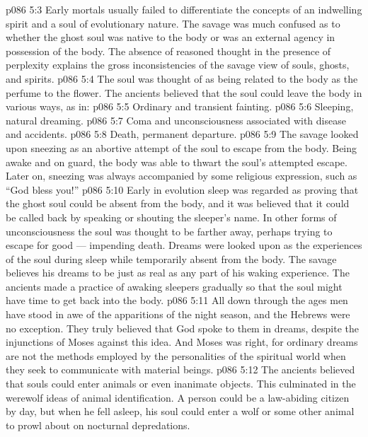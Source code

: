 \vs p086 5:3 Early mortals usually failed to differentiate the concepts of an indwelling spirit and a soul of evolutionary nature. The savage was much confused as to whether the ghost soul was native to the body or was an external agency in possession of the body. The absence of reasoned thought in the presence of perplexity explains the gross inconsistencies of the savage view of souls, ghosts, and spirits.
\vs p086 5:4 The soul was thought of as being related to the body as the perfume to the flower. The ancients believed that the soul could leave the body in various ways, as in:
\vs p086 5:5 \bibnobreakspace Ordinary and transient fainting.
\vs p086 5:6 \bibnobreakspace Sleeping, natural dreaming.
\vs p086 5:7 \bibnobreakspace Coma and unconsciousness associated with disease and accidents.
\vs p086 5:8 \bibnobreakspace Death, permanent departure.
\vs p086 5:9 \pc The savage looked upon sneezing as an abortive attempt of the soul to escape from the body. Being awake and on guard, the body was able to thwart the soul’s attempted escape. Later on, sneezing was always accompanied by some religious expression, such as “God bless you!”
\vs p086 5:10 \pc Early in evolution sleep was regarded as proving that the ghost soul could be absent from the body, and it was believed that it could be called back by speaking or shouting the sleeper’s name. In other forms of unconsciousness the soul was thought to be farther away, perhaps trying to escape for good --- impending death. Dreams were looked upon as the experiences of the soul during sleep while temporarily absent from the body. The savage believes his dreams to be just as real as any part of his waking experience. The ancients made a practice of awaking sleepers gradually so that the soul might have time to get back into the body.
\vs p086 5:11 All down through the ages men have stood in awe of the apparitions of the night season, and the Hebrews were no exception. They truly believed that God spoke to them in dreams, despite the injunctions of Moses against this idea. And Moses was right, for ordinary dreams are not the methods employed by the personalities of the spiritual world when they seek to communicate with material beings.
\vs p086 5:12 The ancients believed that souls could enter animals or even inanimate objects. This culminated in the werewolf ideas of animal identification. A person could be a law\hyp{}abiding citizen by day, but when he fell asleep, his soul could enter a wolf or some other animal to prowl about on nocturnal depredations.
